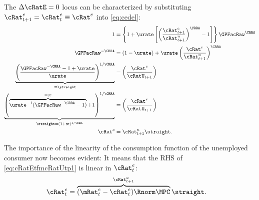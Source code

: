 \documentclass{handout}
\begin{document}
The $\dcEqZero$ locus can be characterized by substituting ${\cRat}^{e}_{t+1}={\cRat}^{e}_{t} \equiv {\cRat}^{e}$ into \eqref{eq:cedel}:
\begin{equation}\begin{gathered}\begin{aligned}
         1 & = \left\{1+\urate\left[\left(\frac{{\cRat}^{e}_{t+1}}{\cRat_{t+1}^{u}}\right)^{\CRRA}-1\right]\right\} \GPFacRaw^{\CRRA} \label{eq:ctp1OctEq1}
\\ \GPFacRaw^{-\CRRA} & =  (1-\urate)+\urate\left(\frac{{\cRat}^{e}_{\tSS}}{\cRat_{t+1}^{u} }\right)^{\CRRA}
\\ \underbrace{\left(\frac{\GPFacRaw^{-\CRRA}-1+\urate}{\urate}\right)^{1/\CRRA}}_{\equiv \straight} & =   \left(\frac{{\cRat}^{e}_{\tSS}}{\cRatU_{t+1}}\right) \label{eq:straightDef}
\\ \underbrace{\left(\overbrace{\urate^{-1}(\GPFacRaw^{-\CRRA}-1)}^{\equiv \varpi}+1\right)^{1/\CRRA}}_{\straight=(1+\varpi)^{1/\CRRA}} & =   \left(\frac{{\cRat}^{e}_{\tSS}}{\cRatU_{t+1}}\right) \label{eq:varpiDef}
\\      {\cRat}^{e}_{\tSS} & = \cRat^{u}_{t+1} \straight \label{eq:cRatEtfmcRatUtp1}.
\end{aligned}\end{gathered}\end{equation}


The importance of the linearity of the consumption function of the unemployed consumer now becomes evident:  It means that the RHS of \eqref{eq:cRatEtfmcRatUtp1} is linear in $\cRat^{e}_{t}$:
\begin{equation}\begin{gathered}\begin{aligned}
  \cRat^{e}_{t} & =  \overbrace{(\mRat^{e}_{t}-{\cRat}^{e}_{t})\Rnorm \MPCU}^{\cRat^{u}_{t+1}} \straight \label{eq:PSTerm}.
\end{aligned}\end{gathered}\end{equation}
\end{document}
